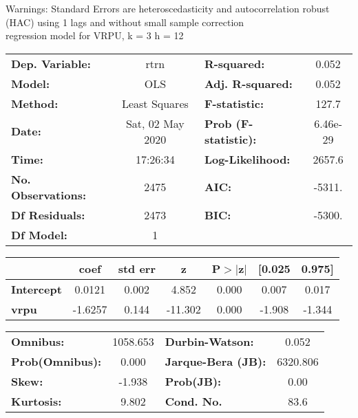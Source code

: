 Warnings: \newline
 [1] Standard Errors are heteroscedasticity and autocorrelation robust (HAC) using 1 lags and without small sample correction\\ 

regression model for VRPU, k = 3 h = 12\begin{center}
\begin{tabular}{lclc}
\toprule
\textbf{Dep. Variable:}    &       rtrn       & \textbf{  R-squared:         } &     0.052   \\
\textbf{Model:}            &       OLS        & \textbf{  Adj. R-squared:    } &     0.052   \\
\textbf{Method:}           &  Least Squares   & \textbf{  F-statistic:       } &     127.7   \\
\textbf{Date:}             & Sat, 02 May 2020 & \textbf{  Prob (F-statistic):} &  6.46e-29   \\
\textbf{Time:}             &     17:26:34     & \textbf{  Log-Likelihood:    } &    2657.6   \\
\textbf{No. Observations:} &        2475      & \textbf{  AIC:               } &    -5311.   \\
\textbf{Df Residuals:}     &        2473      & \textbf{  BIC:               } &    -5300.   \\
\textbf{Df Model:}         &           1      & \textbf{                     } &             \\
\bottomrule
\end{tabular}
\begin{tabular}{lcccccc}
                   & \textbf{coef} & \textbf{std err} & \textbf{z} & \textbf{P$> |$z$|$} & \textbf{[0.025} & \textbf{0.975]}  \\
\midrule
\textbf{Intercept} &       0.0121  &        0.002     &     4.852  &         0.000        &        0.007    &        0.017     \\
\textbf{vrpu}      &      -1.6257  &        0.144     &   -11.302  &         0.000        &       -1.908    &       -1.344     \\
\bottomrule
\end{tabular}
\begin{tabular}{lclc}
\textbf{Omnibus:}       & 1058.653 & \textbf{  Durbin-Watson:     } &    0.052  \\
\textbf{Prob(Omnibus):} &   0.000  & \textbf{  Jarque-Bera (JB):  } & 6320.806  \\
\textbf{Skew:}          &  -1.938  & \textbf{  Prob(JB):          } &     0.00  \\
\textbf{Kurtosis:}      &   9.802  & \textbf{  Cond. No.          } &     83.6  \\
\bottomrule
\end{tabular}
\end{center}

